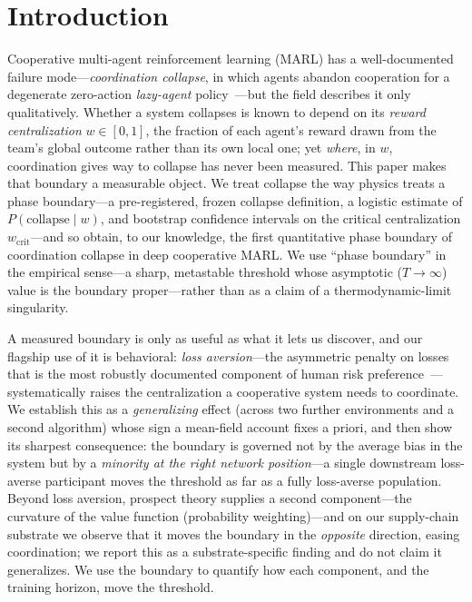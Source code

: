 \documentclass[letterpaper]{article}
\theoremstyle{plain}
\newcommand{\wcrit}{w_{\mathrm{crit}}}
\begin{document}
\section{Introduction}
\label{sec:intro}

Cooperative multi-agent reinforcement learning (MARL) has a well-documented
failure mode---\emph{coordination collapse}, in which agents abandon
cooperation for a degenerate zero-action \emph{lazy-agent}
policy~\citep{liu2023lazy,peng2023curo}---but the field describes it only
qualitatively. Whether a system collapses is known to depend on its
\emph{reward centralization} $w \in [0,1]$, the fraction of each agent's
reward drawn from the team's global outcome rather than its own local one;
yet \emph{where}, in $w$, coordination gives way to collapse has never been
measured. This paper makes that boundary a measurable object. We treat
collapse the way physics treats a phase boundary---a pre-registered, frozen
collapse definition, a logistic estimate of $P(\mathrm{collapse}\mid w)$, and
bootstrap confidence intervals on the critical centralization $\wcrit$---and
so obtain, to our knowledge, the first quantitative phase boundary of
coordination collapse in deep cooperative MARL. We use ``phase boundary'' in
the empirical sense---a sharp, metastable threshold whose asymptotic
($T\!\to\!\infty$) value is the boundary proper---rather than as a claim of a
thermodynamic-limit singularity.

A measured boundary is only as useful as what it lets us discover, and our
flagship use of it is behavioral: \emph{loss aversion}---the asymmetric penalty
on losses that is the most robustly documented component of human risk
preference~\citep{kahneman1979,tversky1992}---systematically raises the
centralization a cooperative system needs to coordinate. We establish this as a
\emph{generalizing} effect (across two further environments and a second
algorithm) whose sign a mean-field account fixes a priori, and then show its
sharpest consequence: the boundary is governed not by the average bias in the
system but by a \emph{minority at the right network position}---a single
downstream loss-averse participant moves the threshold as far as a fully
loss-averse population. Beyond loss aversion, prospect theory supplies a second
component---the curvature of the value function (probability weighting)---and on
our supply-chain substrate we observe that it moves the boundary in the
\emph{opposite} direction, easing coordination; we report this as a
substrate-specific finding and do not claim it generalizes. We use the boundary
to quantify how each component, and the training horizon, move the threshold.
\end{document}

